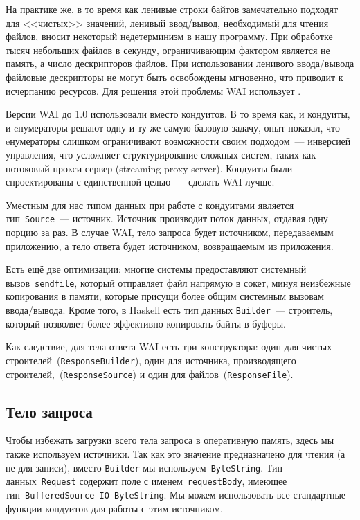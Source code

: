 На практике же, в то время как ленивые строки байтов замечательно подходят для <<чистых>> значений,
ленивый ввод/вывод, необходимый для чтения файлов, вносит некоторый
недетерминизм в нашу программу. При обработке тысяч небольших файлов в секунду, ограничивающим
фактором является не память, а число дескрипторов файлов. При использовании ленивого
ввода/вывода файловые дескрипторы не могут быть освобождены мгновенно, что приводит к
исчерпанию ресурсов. Для решения этой проблемы WAI использует  .

\begin{remark}
Версии WAI до 1.0 использовали   вместо кондуитов. В то время как, и кондуиты,
и eнумераторы решают одну и ту же самую базовую задачу, опыт показал, что eнумераторы слишком
ограничивают возможности своим подходом~--- инверсией управления, что усложняет структурирование
сложных систем, таких как потоковый прокси-сервер (streaming proxy server). Кондуиты были спроектированы
с единственной целью~--- сделать WAI лучше.
\end{remark}

Уместным для нас типом данных при работе с кондуитами является тип~\lstinline!Source!~--- источник. Источник производит
поток данных, отдавая одну порцию за раз. В случае WAI, тело запроса будет источником,
передаваемым приложению, а тело ответа будет источником, возвращаемым из приложения.

Есть ещё две оптимизации: многие системы предоставляют системный вызов~\texttt{sendfile}, который
отправляет файл напрямую в сокет, минуя неизбежные копирования в памяти, которые присущи
более общим системным вызовам ввода/вывода. Кроме того, в Haskell есть тип данных
\lstinline!Builder!~--- строитель, который позволяет более эффективно копировать
байты в буферы.

Как следствие, для тела ответа WAI есть три конструктора: один для чистых строителей~(\lstinline!ResponseBuilder!),
один для источника, производящего строителей,~(\lstinline!ResponseSource!) и
один для файлов~(\lstinline!ResponseFile!).

\subsection {Тело запроса}
Чтобы избежать загрузки всего тела запроса в оперативную память, здесь мы также используем
источники. Так как это значение предназначено для чтения (а не для записи), вместо \lstinline!Builder! мы используем~\lstinline!ByteString!. Тип данных~\lstinline!Request! содержит
поле с именем~\lstinline!requestBody!, имеющее тип~\lstinline!BufferedSource IO ByteString!.
Мы можем использовать все стандартные функции кондуитов для работы с этим источником.

